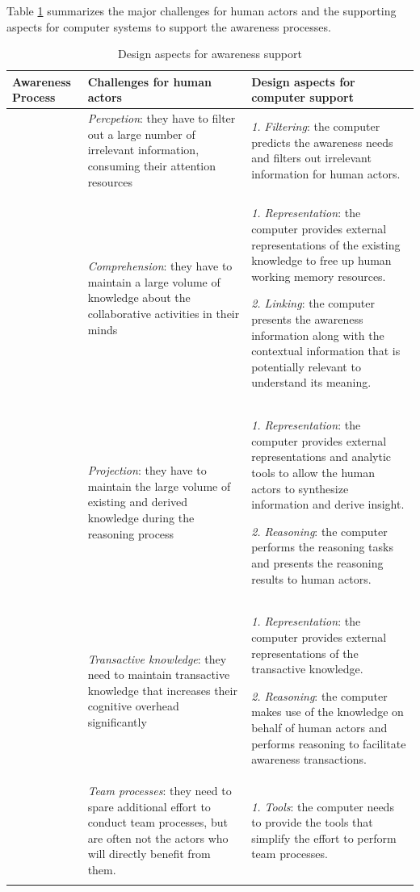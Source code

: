 Table \ref{tab:design_aspects} summarizes the major challenges for human actors and the supporting aspects for computer systems to support the awareness processes.
{\footnotesize
\begin{longtable}{>{\raggedright}p{1.2in}>{\raggedright}p{2.2in}>{\raggedright}p{2.2in}}
\toprule 
\textbf{Awareness Process} & \textbf{Challenges for human actors} & \textbf{Design aspects for computer support}\tabularnewline
\midrule 
\multirow{3}{1.2in}{Development of individual awareness} & \emph{Percpetion}: they have to filter out a large number of irrelevant
information, consuming their attention resources & \emph{1.} \emph{Filtering}: the computer predicts the awareness needs
and filters out irrelevant information for human actors.\tabularnewline
\cmidrule{2-3} 
 & \emph{Comprehension}: they have to maintain a large volume of knowledge
about the collaborative activities in their minds & \emph{1. Representation}: the computer provides external representations
of the existing knowledge to free up human working memory resources.

\emph{2. Linking}: the computer presents the awareness information
along with the contextual information that is potentially relevant
to understand its meaning.\tabularnewline
\cmidrule{2-3} 
 & \emph{Projection}: they have to maintain the large volume of existing
and derived knowledge during the reasoning process  & \emph{1. Representation}: the computer provides external representations
and analytic tools to allow the human actors to synthesize information
and derive insight.

\emph{2. Reasoning}: the computer performs the reasoning tasks and
presents the reasoning results to human actors.\tabularnewline
\midrule 
\multirow{3}{1.2in}{Development of collaborative awareness} & \emph{Transactive knowledge}: they need to maintain transactive knowledge
that increases their cognitive overhead significantly & \emph{1. Representation}: the computer provides external representations
of the transactive knowledge.

\emph{2. Reasoning}: the computer makes use of the knowledge on behalf
of human actors and performs reasoning to facilitate awareness transactions.\tabularnewline
\cmidrule{2-3} 
 & \emph{Team processes}: they need to spare additional effort to conduct
team processes, but are often not the actors who will directly benefit
from them. & \emph{1. Tools}: the computer needs to provide the tools that simplify
the effort to perform team processes.\tabularnewline
\bottomrule
\caption{Design aspects for awareness support}
\label{tab:design_aspects}
\end{longtable}   
}

